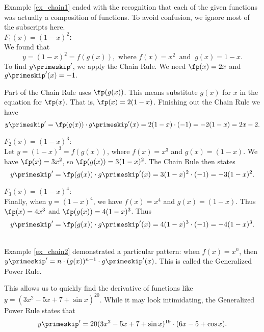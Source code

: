 {Example \ref{ex_chain1} ended with the recognition that each of the given functions was actually a composition of functions. To avoid confusion, we ignore most of the subscripts here. \\ %

\noindent\textbf{$F_1(x) = (1-x)^2$:}\\

We found that $$y=(1-x)^2 = f(g(x)), \text{ where } f(x) = x^2\ \text{ and }\ g(x) = 1-x.$$
To find $y\primeskip'$, we apply the Chain Rule. We need $\fp(x)=2x$ and $g\primeskip'(x)=-1.$

Part of the Chain Rule uses $\fp(g(x))$. This means substitute $g(x)$ for $x$ in the equation for $\fp(x)$. That is, $\fp(x) = 2(1-x)$.  Finishing out the Chain Rule we have $$y\primeskip' = \fp(g(x))\cdot g\primeskip'(x) = 2(1-x)\cdot (-1) = -2(1-x)= 2x-2.$$

\noindent $F_2(x) = (1-x)^3$:\\

Let $y = (1-x)^3 = f(g(x))$, where $f(x) = x^3$ and $g(x) = (1-x)$. We have $\fp(x) = 3x^2$, so $\fp(g(x)) = 3(1-x)^2$. The Chain Rule then states $$y\primeskip' = \fp(g(x))\cdot g\primeskip'(x) = 3(1-x)^2\cdot(-1) = -3(1-x)^2.$$

\enlargethispage{2\baselineskip}%
\noindent $F_3(x) = (1-x)^4$:\\

Finally, when $y = (1-x)^4$, we have $f(x)= x^4$ and $g(x) = (1-x)$. Thus $\fp(x) = 4x^3$ and $\fp(g(x)) = 4(1-x)^3$. Thus $$y\primeskip' = \fp(g(x))\cdot g\primeskip'(x) = 4(1-x)^3\cdot (-1) = -4(1-x)^3.$$
\baselineskip
}\\

Example \ref{ex_chain2} demonstrated a particular pattern: when $f(x)=x^n$, then $y\primeskip' =n\cdot (g(x))^{n-1}\cdot g\primeskip'(x)$. This  is called the Generalized Power Rule.\\



This allows us to quickly find the derivative of functions like $y = (3x^2-5x+7+\sin x)^{20}$. While it may look intimidating, the Generalized Power Rule states that $$y\primeskip' = 20(3x^2-5x+7+\sin x)^{19}\cdot (6x-5+\cos x).$$

